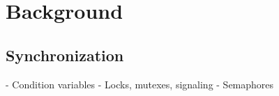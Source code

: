 \section{Background}

\subsection{Synchronization}
- Condition variables
- Locks, mutexes, signaling
- Semaphores

